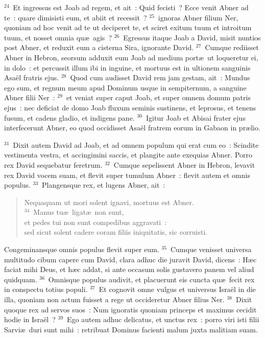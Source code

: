 ${}^{24}$~Et ingressus est Joab ad regem, et ait~: Quid fecisti~? Ecce venit Abner ad te~: quare dimisisti eum, et abiit et recessit~?
${}^{25}$~ignoras Abner filium Ner, quoniam ad hoc venit ad te ut deciperet te, et sciret exitum tuum et introitum tuum, et nosset omnia qu\ae\ agis~?
${}^{26}$~Egressus itaque Joab a David, misit nuntios post Abner, et reduxit eum a cisterna Sira, ignorante David.
${}^{27}$~Cumque rediisset Abner in Hebron, seorsum adduxit eum Joab ad medium port\ae\ ut loqueretur ei, in dolo~: et percussit illum ibi in inguine, et mortuus est in ultionem sanguinis Asa\"el fratris ejus.
${}^{28}$~Quod cum audisset David rem jam gestam, ait~: Mundus ego sum, et regnum meum apud Dominum usque in sempiternum, a sanguine Abner filii Ner~:
${}^{29}$~et veniat super caput Joab, et super omnem domum patris ejus~: nec deficiat de domo Joab fluxum seminis sustinens, et leprosus, et tenens fusum, et cadens gladio, et indigens pane.
${}^{30}$~Igitur Joab et Abisai frater ejus interfecerunt Abner, eo quod occidisset Asa\"el fratrem eorum in Gabaon in pr\ae lio.


${}^{31}$~Dixit autem David ad Joab, et ad omnem populum qui erat cum eo~: Scindite vestimenta vestra, et accingimini saccis, et plangite ante exequias Abner. Porro rex David sequebatur feretrum.
${}^{32}$~Cumque sepelissent Abner in Hebron, levavit rex David vocem suam, et flevit super tumulum Abner~: flevit autem et omnis populus.
${}^{33}$~Plangensque rex, et lugens Abner, ait~: \begin{verse}Nequaquam ut mori solent ignavi, mortuus est Abner.\\
${}^{34}$~Manus tu\ae\ ligat\ae\ non sunt,\\ et pedes tui non sunt compedibus aggravati~:\\ sed sicut solent cadere coram filiis iniquitatis, sic corruisti.\end{verse}

 Congeminansque omnis populus flevit super eum.
${}^{35}$~Cumque venisset universa multitudo cibum capere cum David, clara adhuc die juravit David, dicens~: H\ae c faciat mihi Deus, et h\ae c addat, si ante occasum solis gustavero panem vel aliud quidquam.
${}^{36}$~Omnisque populus audivit, et placuerunt eis cuncta qu\ae\ fecit rex in conspectu totius populi.
${}^{37}$~Et cognovit omne vulgus et universus Isra\"el in die illa, quoniam non actum fuisset a rege ut occideretur Abner filius Ner.
${}^{38}$~Dixit quoque rex ad servos suos~: Num ignoratis quoniam princeps et maximus cecidit hodie in Isra\"el~?
${}^{39}$~Ego autem adhuc delicatus, et unctus rex~: porro viri isti filii Sarvi\ae\ duri sunt mihi~: retribuat Dominus facienti malum juxta malitiam suam.

